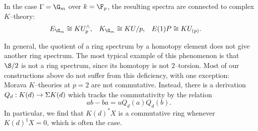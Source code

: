 \begin{example}\label{ExampleOfMoravasTheoriesAtGm}
In the case \(\Gamma = \G_m\) over \(k = \F_p\), the resulting spectra are connected to complex \(K\)--theory:
\begin{align*}
E_{\G_m} & \cong KU^\wedge_p, &
K_{\G_m} & \cong KU / p, &
E(1)P & \cong KU_{(p)}.
\end{align*}
\end{example}

\begin{remark}\label{MoravaKIsNotCommutative}
In general, the quotient of a ring spectrum by a homotopy element does not give another ring spectrum.  The most typical example of this phenomenon is that \(\S/2\) is not a ring spectrum, since its homotopy is not \(2\)--torsion.  Most of our constructions above do not suffer from this deficiency, with one exception: Morava \(K\)--theories at \(p = 2\) are not commutative.  Instead, there is a derivation \(Q_d: K(d) \to \Sigma K(d)\) which tracks the commutativity by the relation \[ab - ba = u Q_d(a) Q_d(b).\]  In particular, we find that \(K(d)^* X\) is a commutative ring whenever \(K(d)^1 X = 0\), which is often the case.
\end{remark}

